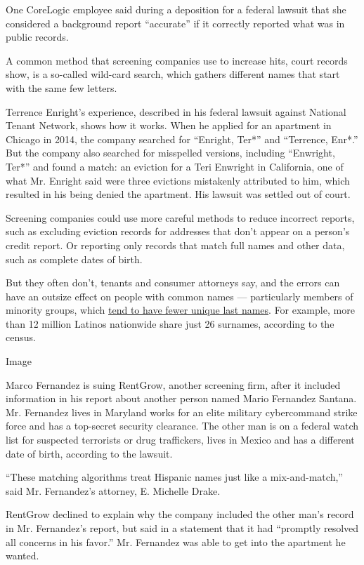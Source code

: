 One CoreLogic employee said during a deposition for a federal lawsuit
that she considered a background report ``accurate'' if it correctly
reported what was in public records.

A common method that screening companies use to increase hits, court
records show, is a so-called wild-card search, which gathers different
names that start with the same few letters.

Terrence Enright's experience, described in his federal lawsuit against
National Tenant Network, shows how it works. When he applied for an
apartment in Chicago in 2014, the company searched for ``Enright, Ter*''
and ``Terrence, Enr*.'' But the company also searched for misspelled
versions, including ``Enwright, Ter*'' and found a match: an eviction
for a Teri Enwright in California, one of what Mr. Enright said were
three evictions mistakenly attributed to him, which resulted in his
being denied the apartment. His lawsuit was settled out of court.

Screening companies could use more careful methods to reduce incorrect
reports, such as excluding eviction records for addresses that don't
appear on a person's credit report. Or reporting only records that match
full names and other data, such as complete dates of birth.

But they often don't, tenants and consumer attorneys say, and the errors
can have an outsize effect on people with common names --- particularly
members of minority groups, which
\href{https://www.census.gov/library/stories/2017/08/what-is-in-a-name.html}{tend
to have fewer unique last names}. For example, more than 12 million
Latinos nationwide share just 26 surnames, according to the census.

Image

Marco Fernandez is suing RentGrow, another screening firm, after it
included information in his report about another person named Mario
Fernandez Santana. Mr. Fernandez lives in Maryland works for an elite
military cybercommand strike force and has a top-secret security
clearance. The other man is on a federal watch list for suspected
terrorists or drug traffickers, lives in Mexico and has a different date
of birth, according to the lawsuit.

``These matching algorithms treat Hispanic names just like a
mix-and-match,'' said Mr. Fernandez's attorney, E. Michelle Drake.

RentGrow declined to explain why the company included the other man's
record in Mr. Fernandez's report, but said in a statement that it had
``promptly resolved all concerns in his favor.'' Mr. Fernandez was able
to get into the apartment he wanted.

